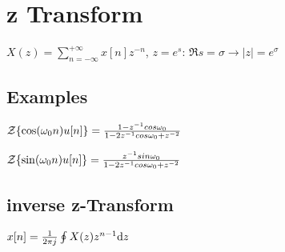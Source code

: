 \section{z Transform}
$X(z) = \sum_{n=-\infty}^{+\infty} x[n] z^{-n}$, $z=e^s$: $\Re s = \sigma \to |z|=e^{\sigma}$

\subsection*{Examples}

$\mathcal Z\{\cos(\omega_0 n) u[n]\}=\frac{1-z^{-1}cos\omega_0}{1-2z^{-1}cos\omega_0+z^{-2}}$

$\mathcal Z\{\sin(\omega_0 n) u[n]\}=\frac{z^{-1}sin\omega_0}{1-2z^{-1}cos\omega_0+z^{-2}}$

\subsection*{inverse z-Transform}

$x[n]=\frac{1}{2\pi j}\oint X(z)z^{n-1}\mathrm{d} z$
